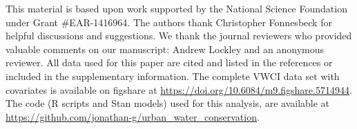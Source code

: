 \documentclass[draft,linenumbers]{agujournal}
\begin{document}
\acknowledgments
\sloppy
This material is based upon work supported by the National Science Foundation
under Grant \#EAR-1416964.
The authors thank Christopher Fonnesbeck for helpful discussions and suggestions.
We thank the journal reviewers who provided valuable comments on our manuscript:
Andrew Lockley and an anonymous reviewer.
All data used for this paper are cited and listed in the references or
included in the supplementary information.
The complete VWCI data set with
covariates is available on figshare at \url{https://doi.org/10.6084/m9.figshare.5714944}.
The code (R scripts and Stan models) used for this analysis, are available at
\url{https://github.com/jonathan-g/urban_water_conservation}.
%
%
\end{document}
